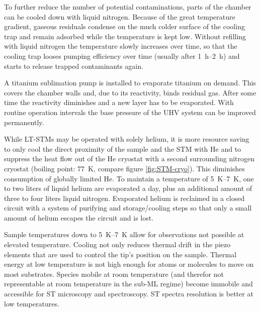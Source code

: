 To further reduce the number of potential contaminations, parts of the chamber can be cooled down with liquid nitrogen. Because of the great temperature gradient, gaseous residuals condense on the much colder surface of the cooling trap and remain adsorbed while the temperature is kept low. Without refilling with liquid nitrogen the temperature slowly increases over time, so that the cooling trap looses pumping efficiency over time (usually after \SIrange{1}{2}{\hour}) and starts to release trapped contaminants again.

A titanium sublimation pump is installed to evaporate titanium on demand. This covers the chamber walls and, due to its reactivity, binds residual gas. After some time the reactivity diminishes and a new layer has to be evaporated. With routine operation intervals the base pressure of the UHV system can be improved permanently.

While LT-STMs may be operated with solely helium, it is more resource saving to only cool the direct proximity of the sample and the STM with He and to suppress the heat flow out of the He cryostat with a second surrounding nitrogen cryostat (boiling point: \SI{77}{\K}, compare figure \ref{fig:STM-cryo}). This diminishes consumption of globally limited He. To maintain a temperature of \SIrange{5}{7}{\K}, one to two liters of liquid helium are evaporated a day, plus an additional amount of three to four liters liquid nitrogen. Evaporated helium is reclaimed in a closed circuit with a system of purifying and storage/cooling steps so that only a small amount of helium escapes the circuit and is lost.

Sample temperatures down to \SIrange{5}{7}{\K} allow for observations not possible at elevated temperature. Cooling not only reduces thermal drift in the piezo elements that are used to control the tip's position on the sample. Thermal energy at low temperature is not high enough for atoms or molecules to move on most substrates. Species mobile at room temperature (and therefor not representable at room temperature in the sub-ML regime) become immobile and accessible for ST microscopy and spectroscopy. ST spectra resolution is better at low temperatures.

